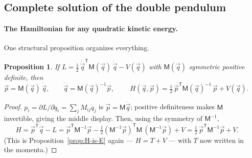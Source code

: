 \documentclass[11pt]{article}
\theoremstyle{plain}
\newtheorem{proposition}[theorem]{Proposition}
\theoremstyle{definition}
\theoremstyle{remark}
\newcommand{\vq}{\vec{q}}
\newcommand{\vp}{\vec{p}}
\newcommand{\mM}{\mathsf{M}}
\begin{document}
\subsection{Complete solution of the double pendulum}
\label{sec:dp-H}

\paragraph{The Hamiltonian for any quadratic kinetic energy.}
One structural proposition organizes everything.

\begin{proposition}\label{prop:matrix-H}
If $L = \tfrac12\,\dot\vq^{\mathsf T}\mM(\vq)\,\dot\vq - V(\vq)$ with
$\mM(\vq)$ symmetric positive definite, then
\begin{equation}
  \vp = \mM(\vq)\,\dot\vq,
  \qquad
  \dot\vq = \mM(\vq)^{-1}\vp,
  \qquad
  \boxed{\;
  H(\vq,\vp) = \tfrac12\,\vp^{\mathsf T}\mM(\vq)^{-1}\,\vp + V(\vq) .
  \;}
\end{equation}
\end{proposition}
\begin{proof}
$p_i = \partial L/\partial\dot q_i = \sum_j M_{ij}\dot q_j$ is
$\vp = \mM\dot\vq$; positive definiteness makes $\mM$ invertible, giving
the middle display. Then, using the symmetry of $\mM^{-1}$,
\begin{equation}
  H = \vp^{\mathsf T}\dot\vq - L
  = \vp^{\mathsf T}\mM^{-1}\vp
  - \tfrac12 (\mM^{-1}\vp)^{\mathsf T}\mM\,(\mM^{-1}\vp) + V
  = \tfrac12\,\vp^{\mathsf T}\mM^{-1}\vp + V .
\end{equation}
(This is Proposition~\ref{prop:H-is-E} again --- $H = T + V$ --- with $T$
now written in the momenta.)
\end{proof}
\end{document}
